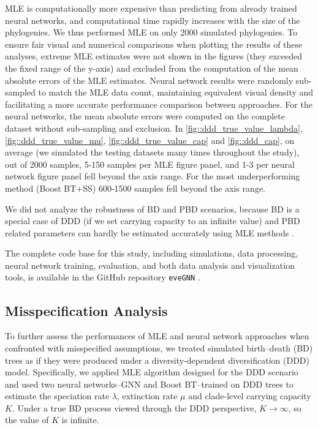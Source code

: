 {MLE is computationally more expensive than predicting from already trained neural networks, and computational time rapidly increases with the size of the phylogenies. We thus performed MLE on only 2000 simulated phylogenies. To ensure fair visual and numerical comparisons when plotting the results of these analyses, extreme MLE estimates were not shown in the figures (they exceeded the fixed range of the y-axis) and excluded from the computation of the mean absolute errors of the MLE estimates. Neural network results were randomly sub-sampled to match the MLE data count, maintaining equivalent visual density and facilitating a more accurate performance comparison between approaches. For the neural networks, the mean absolute errors were computed on the complete dataset without sub-sampling and exclusion. In  \autoref{fig::ddd_true_value_lambda}, \autoref{fig::ddd_true_value_mu}, \autoref{fig::ddd_true_value_cap} and \autoref{fig::ddd_cap}, on average (we simulated the testing datasets many times throughout the study), out of 2000 samples, 5-150 samples per MLE figure panel, and 1-3 per neural network figure panel fell beyond the axis range. For the most underperforming method (Boost BT+SS) 600-1500 samples fell beyond the axis range.

We did not analyze the robustness of BD and PBD scenarios, because BD is a special case of DDD (if we set carrying capacity to an infinite value) and PBD related parameters can hardly be estimated accurately using MLE methods \citep{etienne_estimating_2014}.

The complete code base for this study, including simulations, data processing, neural network training, evaluation, and both data analysis and visualization tools, is available in the GitHub repository \texttt{eveGNN} \citep{qin_evegnn_2023}.

\subsection{Misspecification Analysis}
\label{ch2::sec::methods::misspec}
To further assess the performances of MLE and neural network approaches when confronted with misspecified assumptions, we treated simulated birth--death (BD) trees as if they were produced under a diversity-dependent diversification (DDD) model. Specifically, we applied MLE algorithm designed for the DDD scenario and used two neural networks--GNN and Boost BT--trained on DDD trees to estimate the speciation rate $\lambda$, extinction rate $\mu$ and clade-level carrying capacity $K$. Under a true BD process viewed through the DDD perspective, $K\to\infty$, so the value of $K$ is infinite.  

}
